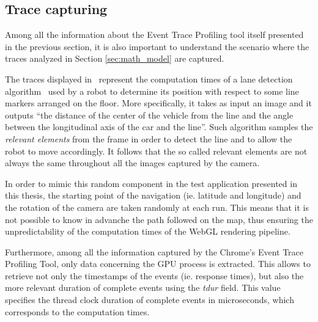 \subsection{Trace capturing}
Among all the information about the Event Trace Profiling tool itself presented
in the previous section, it is
also important to understand the scenario where the traces analyzed in Section
\ref{sec:math_model} are captured.

The traces displayed in~\cite{frias2017probabilistic} represent the computation
times of a lane detection algorithm~\cite{fontanelli2014vision} used by a robot
to determine its position with respect to some line markers arranged on the floor.
More specifically, it takes as input an image and it outputs ``the distance
of the center of the vehicle from the line and the angle between the longitudinal
axis of the car and the line''. Such algorithm samples the \emph{relevant elements}
from the frame in order to detect the line and to allow the robot to move accordingly.
It follows that the so called relevant elements are not always the same throughout
all the images captured by the camera.

In order to mimic this random component in the test application presented in this
thesis, the starting point of the navigation (ie. latitude and longitude) and
the rotation of the camera are taken randomly at each run.
This means that it is not possible to know in advanche the path followed on the
map, thus ensuring the unpredictability of the computation times of the WebGL
rendering pipeline.

Furthermore, among all the information captured by the
Chrome's Event Trace Profiling Tool, only data concerning the GPU process is
extracted. This allows to retrieve not only the timestamps of the events (ie.
response times), but also the more relevant duration of complete events using
the \emph{tdur} field. This value specifies the thread clock duration of complete
events in microseconds, which corresponds to the computation times.


